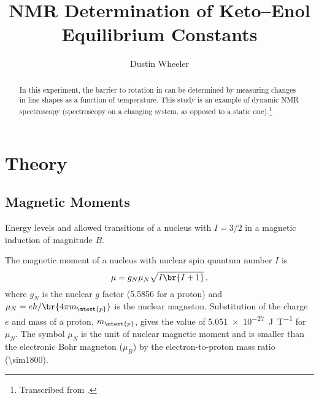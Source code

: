 \documentclass[nobib,nofonts,nols,nohyper]{tufte-handout}
\title{NMR Determination of Keto--Enol Equilibrium Constants}
\author{Dustin Wheeler}
\begin{document}
\maketitle%

\begin{abstract}
\noindent
In this experiment, the barrier to rotation in  can be determined by measuring changes in \NMR* line shapes as a function of temperature. This study is an example of dynamic NMR spectroscopy (spectroscopy on a changing system, as opposed to a static one).\thanks{Transcribed from \textcite{nibler14,gasparro77}.}
\end{abstract}


\section{Theory} %
\label{sec:theory}

\subsection{Magnetic Moments} %
\label{sub:magnetic_moments}

\begin{marginfigure}
  \centering
   
  \caption{Energy levels and allowed transitions of a nucleus with \( I = 3/2 \) in a magnetic induction of magnitude \( B \).}
  \label{fig:quad_splitting}
\end{marginfigure}
The magnetic moment of a nucleus with nuclear spin quantum number \( I \) is 
\begin{equation}
	\mu = g_N \mu_N \sqrt{I \br{I+1}} \, ,
	\label{eq:mag_mom}
\end{equation}
where \( g_N \) is the nuclear \( g \) factor (\num{5.5856} for a proton) and \( \mu_N = e h / \br{4 \pi m_\mtext{p}} \) is the nuclear magneton.
Substitution of the charge \( e \) and mass of a proton, \( m_\mtext{p} \), gives the value of \qty{5.051e-27}{\joule\per\tesla} for \( \mu_N \). 
The symbol \( \mu_N \) is the unit of nuclear magnetic moment and is smaller than the electronic Bohr magneton (\( \mu_B \)) by the electron-to-proton mass ratio (\num{\sim1800}). 
\end{document}
